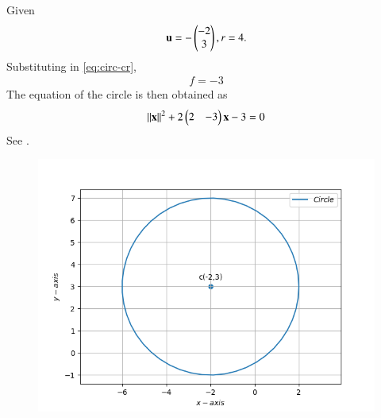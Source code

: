 Given
\begin{align}
	\mathbf{u} = -\begin{pmatrix}-2\\3\end{pmatrix},  r = 4.
\end{align}
Substituting in 
	\eqref{eq:circ-cr},
\begin{align}
	f = -3
\end{align}
The equation of the circle is then obtained as
\begin{align}
	\left\lVert\mathbf{x}\right\rVert^2 + 2\begin{pmatrix}2&-3\end{pmatrix}\mathbf{x} -3=0     		       
\end{align}	
See  
.
\begin{figure}[!h]
	\begin{center} 
	    \includegraphics[width=\columnwidth]{chapters/11/11/1/2/figs/circle.png}
	\end{center}
\caption{}
\label{fig:chapters/11/11/1/2/Fig1}
\end{figure}

